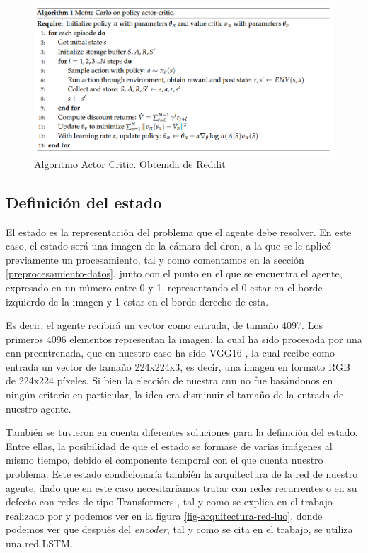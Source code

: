 \begin{figure}[ht!]
	\centering
	\includegraphics[scale=0.5]{figuras/algoritmo_actor_critic.png}
	\caption[Algoritmo Actor Critic]{Algoritmo Actor Critic. Obtenida de \href{https://preview.redd.it/6dfwcx17zwi21.png?width=971&format=png&auto=webp&s=e1f13781cf1b436425b8e7e802fc24b6a6951e8e}{Reddit}}
	\label{fig-algoritmo-actor-critic}
\end{figure}

\subsection{Definición del estado}
\label{definicion-del-estado}

El estado es la representación del problema que el agente debe resolver. En este caso, el estado será una imagen de la cámara del dron, a la que se le aplicó previamente un procesamiento, tal y como comentamos en la sección \ref{preprocesamiento-datos}, junto con el punto en el que se encuentra el agente, expresado en un número entre 0 y 1, representando el 0 estar en el borde izquierdo de la imagen y 1 estar en el borde derecho de esta.
\medskip

Es decir, el agente recibirá un vector como entrada, de tamaño 4097. Los primeros 4096 elementos representan la imagen, la cual ha sido procesada por una \acrshort{cnn} preentrenada, que en nuestro caso ha sido VGG16 \citep{vgg16}, la cual recibe como entrada un vector de tamaño 224x224x3, es decir, una imagen en formato RGB de 224x224 píxeles. Si bien la elección de nuestra \acrshort{cnn} no fue basándonos en ningún criterio en particular, la idea era disminuir el tamaño de la entrada de nuestro agente. 
\medskip

También se tuvieron en cuenta diferentes soluciones para la definición del estado. Entre ellas, la posibilidad de que el estado se formase de varias imágenes al mismo tiempo, debido el componente temporal con el que cuenta nuestro problema. Este estado condicionaría también la arquitectura de la red de nuestro agente, dado que en este caso necesitaríamos tratar con redes recurrentes o en su defecto con redes de tipo Transformers \citep{transformers}, tal y como se explica en el trabajo realizado por \citet{luo2019end} y podemos ver en la figura \ref{fig-arquitectura-red-luo}, donde podemos ver que después del \textit{encoder}, tal y como se cita en el trabajo, se utiliza una red \acrshort{LSTM}.
\medskip

